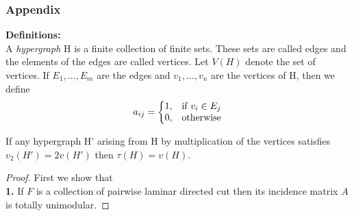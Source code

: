 \documentclass[8pt]{beamer}
\begin{document}
\begin{frame}
\frametitle{Appendix}
\textbf{Definitions:}\\
A \textit{hypergraph} H is a finite collection of finite sets. These sets are called edges and the elements of the edges are called vertices. Let $V(H)$ denote the set of vertices. If $E_1,\dots,E_m$ are the edges and $v_1,\dots,v_n$ are the vertices of H, then we define 
$$
    a_{ij}=\left\{
    \begin{array}{@{}ll@{}}
    1, & \text{if}\ v_i \in E_j \\
    0, & \text{otherwise}
    \end{array}\right.
$$

\begin{hypergraph}[Hypergraph]
If any hypergraph H' arising from H by multiplication of the vertices satisfies $v_2(H') = 2v(H')$ then $\tau(H) = v(H)$. 
\end{hypergraph}

\begin{proof}
First we show that\\
\textbf{1.} If $F$ is a collection of pairwise laminar directed cut then its incidence matrix $A$ is totally unimodular. 

\end{proof}

\end{frame}
\end{document}
